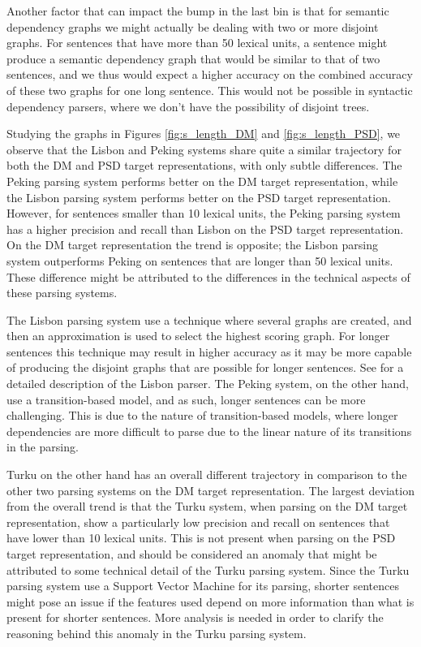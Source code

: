 Another factor that can impact the bump in the last bin is that for semantic dependency graphs we might actually be dealing with two or more disjoint graphs. For sentences that have more than 50 lexical units, a sentence might produce a semantic dependency graph that would be similar to that of two sentences, and we thus would expect a higher accuracy on the combined accuracy of these two graphs for one long sentence. This would not be possible in syntactic dependency parsers, where we don't have the possibility of disjoint trees.

Studying the graphs in Figures \ref{fig:s_length_DM} and \ref{fig:s_length_PSD}, we observe that the Lisbon and Peking systems share quite a similar trajectory for both the DM and PSD target representations, with only subtle differences. The Peking parsing system performs better on the DM target representation, while the Lisbon parsing system performs better on the PSD target representation. However, for sentences smaller than 10 lexical units, the Peking parsing system has a higher precision and recall than Lisbon on the PSD target representation. On the DM target representation the trend is opposite; the Lisbon parsing system outperforms Peking on sentences that are longer than 50 lexical units. These difference might be attributed to the differences in the technical aspects of these parsing systems.

The Lisbon parsing system use a technique where several graphs are created, and then an approximation is used to select the highest scoring graph. For longer sentences this technique may result in higher accuracy as it may be more capable of producing the disjoint graphs that are possible for longer sentences. See  for a detailed description of the Lisbon parser. The Peking system, on the other hand, use a transition-based model, and as such, longer sentences can be more challenging. This is due to the nature of transition-based models, where longer dependencies are more difficult to parse due to the linear nature of its transitions in the parsing.

Turku on the other hand has an overall different trajectory in comparison to the other two parsing systems on the DM target representation. The largest deviation from the overall trend is that the Turku system, when parsing on the DM target representation, show a particularly low precision and recall on sentences that have lower than 10 lexical units. This is not present when parsing on the PSD target representation, and should be considered an anomaly that might be attributed to some technical detail of the Turku parsing system. Since the Turku parsing system use a Support Vector Machine for its parsing, shorter sentences might pose an issue if the features used depend on more information than what is present for shorter sentences. More analysis is needed in order to clarify the reasoning behind this anomaly in the Turku parsing system.



